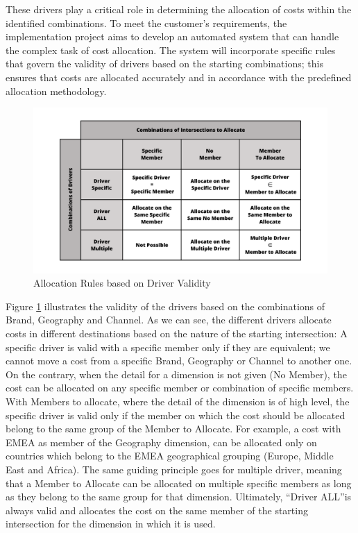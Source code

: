 \documentclass[12pt,a4paper,openright,twoside]{book}
\begin{document}
These drivers play a critical role in determining the allocation of costs within the identified combinations.
%
To meet the customer's requirements, the implementation project aims to develop an automated system that can handle the complex task of cost allocation. 
%
The system will incorporate specific rules that govern the validity of drivers based on the starting combinations; this ensures that costs are allocated accurately and in accordance with the predefined allocation methodology.

\begin{figure}[htbp]
	\centering
	\includegraphics[width=\linewidth]{figures/driver-table.pdf}
	\caption{Allocation Rules based on Driver Validity}
	\label{fig:driver}
\end{figure}

Figure \ref{fig:driver} illustrates the validity of the drivers based on the combinations of Brand, Geography and Channel.
%
As we can see, the different drivers allocate costs in different destinations based on the nature of the  starting intersection:
%
A specific driver is valid with a specific member only if they are equivalent; we cannot move a cost from a specific Brand, Geography or Channel to another one.
%
On the contrary, when the detail for a dimension is not given (No Member), the cost can be allocated on any specific member or combination of specific members.
%
With Members to allocate, where the detail of the dimension is of high level, the specific driver is valid only if the member on which the cost should be allocated belong to the same group of the Member to Allocate.
%
For example, a cost with EMEA as member of the Geography dimension, can be allocated only on countries which belong to the EMEA geographical grouping (Europe, Middle East and Africa).
%
The same guiding principle goes for multiple driver, meaning that a Member to Allocate can be allocated on multiple specific members as long as they belong to the same group for that dimension.
%
Ultimately, ``Driver ALL''is always valid and allocates the cost on the same member of the starting intersection for the dimension in which it is used.
\end{document}
